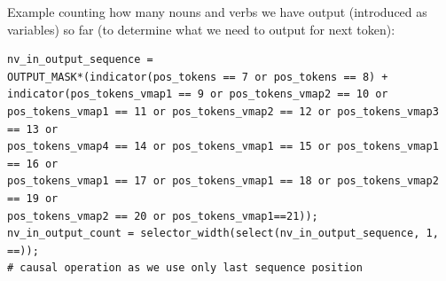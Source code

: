 \documentclass[11pt]{article}
\begin{document}
Example counting how many nouns and verbs we have output (introduced as variables) so far (to determine what we need to output for next token):
\begin{tiny}
\begin{verbatim}
nv_in_output_sequence = 
OUTPUT_MASK*(indicator(pos_tokens == 7 or pos_tokens == 8) + 
indicator(pos_tokens_vmap1 == 9 or pos_tokens_vmap2 == 10 or 
pos_tokens_vmap1 == 11 or pos_tokens_vmap2 == 12 or pos_tokens_vmap3 == 13 or 
pos_tokens_vmap4 == 14 or pos_tokens_vmap1 == 15 or pos_tokens_vmap1 == 16 or 
pos_tokens_vmap1 == 17 or pos_tokens_vmap1 == 18 or pos_tokens_vmap2 == 19 or 
pos_tokens_vmap2 == 20 or pos_tokens_vmap1==21));
nv_in_output_count = selector_width(select(nv_in_output_sequence, 1, ==)); 
# causal operation as we use only last sequence position
\end{verbatim}
\end{tiny}
\end{document}
